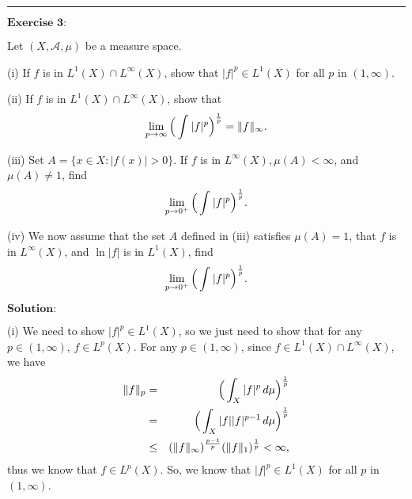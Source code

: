 \documentclass[12pt,a4paper]{ctexart}
\begin{document}
\noindent\rule[0.25\baselineskip]{\textwidth}{0.5pt}

\vspace{8pt}

$\textbf{Exercise 3:}$

Let $(X, \mathcal{A}, \mu)$ be a measure space.

(i) If $f$ is in $L^{1}(X) \cap L^{\infty}(X)$, show that $|f|^{p} \in L^{1}(X)$ for all $p$ in $(1, \infty)$.

(ii) If $f$ is in $L^{1}(X) \cap L^{\infty}(X)$, show that
\begin{equation*}
    \lim_{p \to \infty} \Big{(} \int_{}^{} |f|^{p} \Big{)}^{\frac{1}{p}} = \|f\|_{\infty}.
\end{equation*}

(iii) Set $A = \{x \in X: |f(x)| > 0\}$. If $f$ is in $L^{\infty} (X), \mu(A) < \infty$, and $\mu(A) \neq 1$, find
\begin{equation*}
    \lim_{p \to 0^{+}} \Big{(} \int_{}^{} |f|^{p} \Big{)}^{\frac{1}{p}}.
\end{equation*}

(iv) We now assume that the set $A$ defined in (iii) satisfies $\mu(A) = 1$, that $f$ is in $L^{\infty}(X)$, and $\ln |f|$ is in $L^{1}(X)$, find
\begin{equation*}
    \lim_{p \to 0^{+}} \Big{(} \int_{}^{} |f|^{p} \Big{)}^{\frac{1}{p}}.
\end{equation*}

\vspace{8pt}
$\textbf{Solution:}$

(i) We need to show $|f|^{p} \in L^{1}(X)$, so we just need to show that for any $p \in (1, \infty)$, $f \in L^{p}(X)$. For any $p \in (1, \infty)$, since $f \in L^{1}(X) \cap L^{\infty}(X)$, we have
\begin{eqnarray*}
    \|f\|_{p} &=& \Big{(} \int_{X}^{} |f|^{p} \, d \mu \Big{)}^{\frac{1}{p}} \\
    &=& \Big{(} \int_{X}^{} |f| |f|^{p-1} \, d \mu \Big{)}^{\frac{1}{p}} \\
    & \leq &  (\|f\|_{\infty})^{\frac{p-1}{p}} (\|f\|_{1})^{\frac{1}{p}} < \infty,
\end{eqnarray*}
thus we know that $f \in L^{p}(X)$. So, we know that $|f|^{p} \in L^{1}(X)$ for all $p$ in $(1, \infty)$.

\vspace{8pt}
\end{document}
